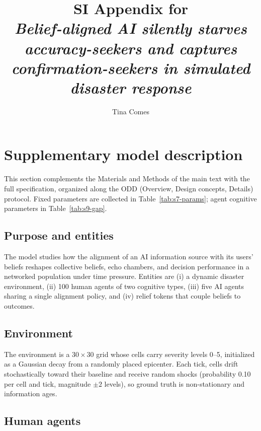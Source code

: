 \documentclass[11pt]{article}
\title{SI Appendix for\\[4pt]
\emph{Belief-aligned AI silently starves accuracy-seekers and captures confirmation-seekers in simulated disaster response}}
\author{Tina Comes}
\date{}
\begin{document}
\maketitle
\tableofcontents

\section{Supplementary model description}\label{si:model}

This section complements the Materials and Methods of the main text with
the full specification, organized along the ODD (Overview, Design
concepts, Details) protocol. Fixed parameters are collected in
Table~\ref{tab:s7-params}; agent cognitive parameters in
Table~\ref{tab:s9-gap}.

\subsection{Purpose and entities}

The model studies how the alignment of an AI information source with its
users' beliefs reshapes collective beliefs, echo chambers, and decision
performance in a networked population under time pressure. Entities are
(i) a dynamic disaster environment, (ii) 100 human agents of two
cognitive types, (iii) five AI agents sharing a single alignment policy,
and (iv) relief tokens that couple beliefs to outcomes.

\subsection{Environment}

The environment is a $30 \times 30$ grid whose cells carry severity
levels 0--5, initialized as a Gaussian decay from a randomly placed
epicenter. Each tick, cells drift stochastically toward their baseline
and receive random shocks (probability 0.10 per cell and tick, magnitude
$\pm 2$ levels), so ground truth is non-stationary and information ages.

\subsection{Human agents}
\end{document}
